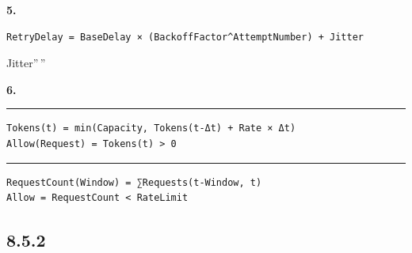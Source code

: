\textbf{5. }

\begin{verbatim}
RetryDelay = BaseDelay × (BackoffFactor^AttemptNumber) + Jitter
\end{verbatim}

Jitter''\,''

\textbf{6. }

\begin{center}\rule{0.5\linewidth}{0.5pt}\end{center}

\begin{verbatim}
Tokens(t) = min(Capacity, Tokens(t-Δt) + Rate × Δt)
Allow(Request) = Tokens(t) > 0
\end{verbatim}

\begin{center}\rule{0.5\linewidth}{0.5pt}\end{center}

\begin{verbatim}
RequestCount(Window) = ∑Requests(t-Window, t)
Allow = RequestCount < RateLimit
\end{verbatim}

\subsection{8.5.2}\label{section-66}

\subsubsection{}\label{section-67}

